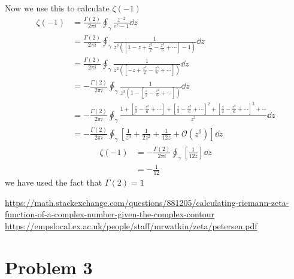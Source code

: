 \documentclass[a4paper,12pt]{article}
\begin{document}
Now we use this to calculate $\zeta(-1)$
\begin{equation}
	\begin{aligned}
				\zeta(-1)&=\frac{\Gamma(2)}{2\pi i}\oint_\gamma \frac{z^{-2}}{e^{z}-1} \dd z
				\\
				&=\frac{\Gamma(2)}{2\pi i}\oint_\gamma
				\frac{1}{z^2\left(\left[1-z+\frac{z^2}{2}-\frac{z^3}{6}+\cdots\right] -1\right)} \dd z
				\\
				&=\frac{\Gamma(2)}{2\pi i}\oint_\gamma
				\frac{1}{z^2\left(\left[-z+\frac{z^2}{2}-\frac{z^3}{6}+\cdots\right]\right)} \dd z
				\\
				&=-\frac{\Gamma(2)}{2\pi i}\oint_\gamma
				\frac{1}{z^3\left(1-\left[\frac{z}{2}-\frac{z^2}{6}+\cdots\right]\right)} \dd z
				\\
				&=-\frac{\Gamma(2)}{2\pi i}\oint_\gamma
				\frac{1+\left[\frac{z}{2}-\frac{z^2}{6}+\cdots\right]+\left[\frac{z}{2}-\frac{z^2}{6}+\cdots\right]^2+\left[\frac{z}{2}-\frac{z^2}{6}+\cdots\right]^3+\cdots}{z^3} \dd z
				\\
				&=-\frac{\Gamma(2)}{2\pi i}\oint_\gamma
			\left[	\frac{1}{z^3}+\frac{1}{2z^2}+\frac{1}{12z}+\mathcal{O}(z^0)\right] \dd z
	\end{aligned}
\end{equation}
\begin{equation}
	\begin{aligned}
		\zeta(-1)
		&=-\frac{\Gamma(2)}{2\pi i}\oint_\gamma
		\left[\frac{1}{12z}\right] \dd z\\
		&=-\frac{1}{12}
	\end{aligned}
\end{equation}
we have used the fact that $\Gamma(2)=1$

\url{https://math.stackexchange.com/questions/881205/calculating-riemann-zeta-function-of-a-complex-number-given-the-complex-contour}
\url{https://empslocal.ex.ac.uk/people/staff/mrwatkin/zeta/petersen.pdf}
\section*{Problem 3}
\end{document}
